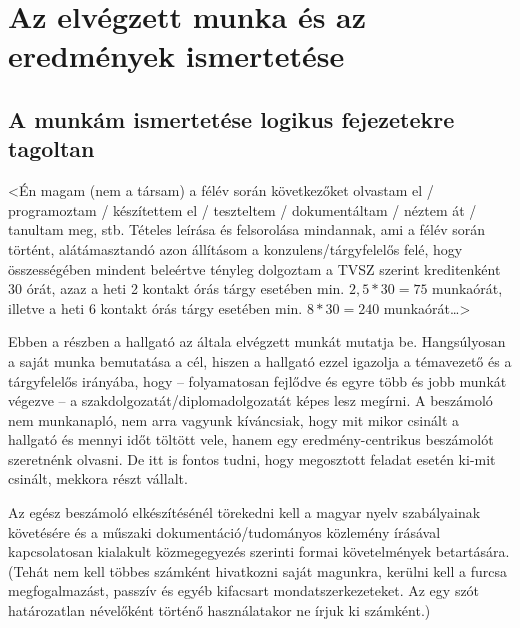\documentclass[a4paper,oneside]{article}
\begin{document}
\newpage
\section{Az elvégzett munka és az eredmények ismertetése}
\label{sec:az-elvegzett-munka}


\subsection{A munkám ismertetése logikus fejezetekre tagoltan}
\label{sec:a-munkam-ismert}
<Én magam (nem a társam) a félév során következőket olvastam el /
programoztam / készítettem el / teszteltem / dokumentáltam / néztem át
/ tanultam meg, stb.  Tételes leírása és felsorolása mindannak, ami a
félév során történt, alátámasztandó azon állításom a
konzulens/tárgyfelelős felé, hogy összességében mindent beleértve
tényleg dolgoztam a TVSZ szerint kreditenként 30 órát, azaz a heti 2
kontakt órás tárgy esetében min. $2,5*30 = 75$ munkaórát, illetve a
heti 6 kontakt órás tárgy esetében min. $8*30 = 240$ munkaórát\dots>

Ebben a részben a hallgató az általa elvégzett munkát mutatja
be. Hangsúlyosan a saját munka bemutatása a cél, hiszen a hallgató
ezzel igazolja a témavezető és a tárgyfelelős irányába, hogy --
folyamatosan fejlődve és egyre több és jobb munkát végezve -- a
szakdolgozatát/diplomadolgozatát képes lesz megírni.  A beszámoló nem
munkanapló, nem arra vagyunk kíváncsiak, hogy mit mikor csinált a
hallgató és mennyi időt töltött vele, hanem egy eredmény-centrikus
beszámolót szeretnénk olvasni.  De itt is fontos tudni, hogy
megosztott feladat esetén ki-mit csinált, mekkora részt vállalt.

Az egész beszámoló elkészítésénél törekedni kell a magyar nyelv
szabályainak követésére és a műszaki dokumentáció/tudományos közlemény
írásával kapcsolatosan kialakult közmegegyezés szerinti formai
követelmények betartására.  (Tehát nem kell többes számként hivatkozni
saját magunkra, kerülni kell a furcsa megfogalmazást, passzív és egyéb
kifacsart mondatszerkezeteket.  Az egy szót határozatlan névelőként
történő használatakor ne írjuk ki számként.)
\end{document}
